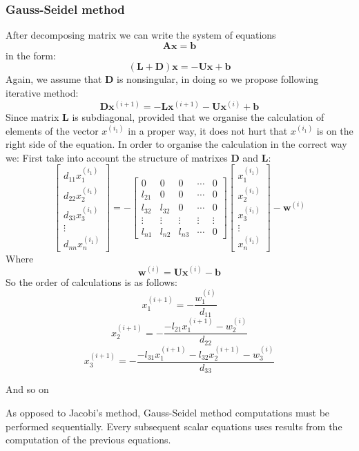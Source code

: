 \subsubsection{Gauss-Seidel method}
After decomposing matrix we can write the system of equations
\[ \mathbf{A}\mathbf{x} = \mathbf{b} \]
in the form:
\[ (\mathbf{L}+\mathbf{D})\mathbf{x} = -\mathbf{U}\mathbf{x}+\mathbf{b}
\]
Again, we assume that \textbf{D} is nonsingular, in doing so we propose following iterative method:
\[ \mathbf{D}\mathbf{x}^{(i+1)} = -\mathbf{L}\mathbf{x}^{(i+1)}-\mathbf{U}\mathbf{x}^{(i)}+\mathbf{b}
\]
Since matrix \textbf{L} is subdiagonal, provided that we organise the calculation of elements of the vector $x^{(i_1)}$ in a proper way, it does not hurt that $x^{(i_1)}$ is on the right side of the equation.
\newpage
In order to organise the calculation in the correct way we:
First take into account the structure of matrixes \textbf{D} and \textbf{L}:
\[
\begin{bmatrix}
d_{11}x_1^{(i_1)}\\
d_{22}x_2^{(i_1)}\\
d_{33}x_3^{(i_1)}\\
\vdots\\
d_{nn}x_n^{(i_1)}
\end{bmatrix}
=
-
\begin{bmatrix}
0 & 0 & 0 & \cdots & 0\\
l_{21} & 0 & 0 & \cdots & 0\\
l_{32} & l_{32} & 0 & \cdots & 0\\
\vdots & \vdots & \vdots & \vdots & \vdots\\
l_{n1} & l_{n2} & l_{n3} & \cdots & 0
\end{bmatrix}
\begin{bmatrix}
x_1^{(i_1)}\\
x_2^{(i_1)}\\
x_3^{(i_1)}\\
\vdots\\
x_n^{(i_1)}
\end{bmatrix}
-
\mathbf{w}^{(i)}
\]
Where
\[ \mathbf{w}^{(i)} = \mathbf{U}\mathbf{x}^{(i)} - \mathbf{b} \]
So the order of calculations is as follows:
\[ x_1^{(i+1)} = -\frac{w_1^{(i)}}{d_{11}} \]
\[ x_2^{(i+1)} = -\frac{-l_{21}x_1^{(i+1)} - w_2^{(i)}}{d_{22}} \]
\[ x_3^{(i+1)} = -\frac{-l_{31}x_1^{(i+1)} -l_{32}x_2^{(i+1)} - w_3^{(i)}}{d_{33}} \]

And so on

As opposed to Jacobi's method, Gauss-Seidel method computations must be performed sequentially. Every subsequent scalar equations uses results from the computation of the previous equations.
